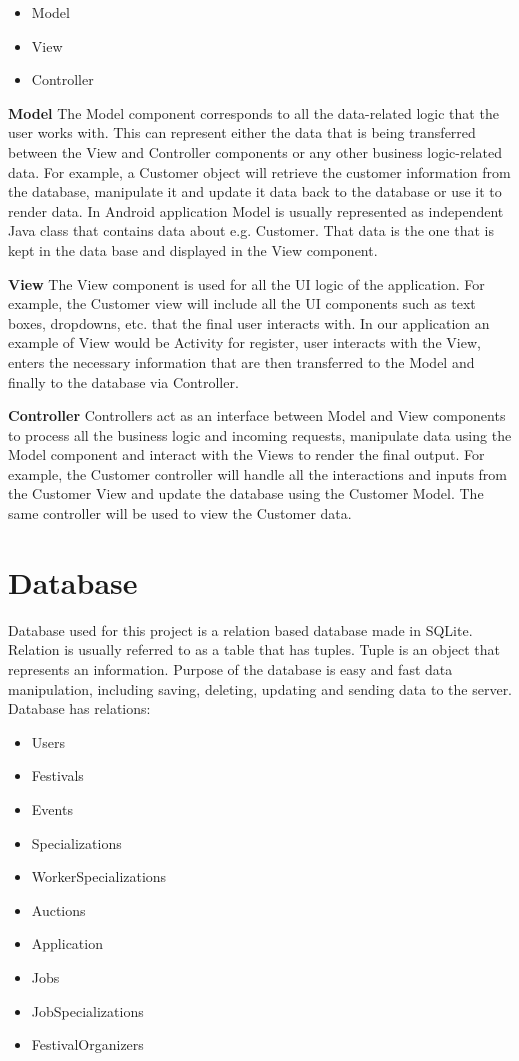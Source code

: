 \begin{itemize}
	\item 	 Model
	\item 	 View
	\item 	 Controller		
\end{itemize}

\textbf{Model}
The Model component corresponds to all the data-related logic that the user works with. This can represent either the data that is being transferred between the View and Controller components or any other business logic-related data. For example, a Customer object will retrieve the customer information from the database, manipulate it and update it data back to the database or use it to render data. 
In Android application Model is usually represented as independent Java class that contains data about e.g. Customer. That data is the one that is kept in the data base and displayed in the View component. 

\textbf{View}
The View component is used for all the UI logic of the application. For example, the Customer view will include all the UI components such as text boxes, dropdowns, etc. that the final user interacts with. 
In our application an example of View would be Activity for register, user interacts with the View, enters the necessary information that are then transferred to the Model and finally to the database via Controller.

\textbf{Controller}
Controllers act as an interface between Model and View components to process all the business logic and incoming requests, manipulate data using the Model component and interact with the Views to render the final output. For example, the Customer controller will handle all the interactions and inputs from the Customer View and update the database using the Customer Model. The same controller will be used to view the Customer data.
\pagebreak


\section{Database}

Database used for this project is a relation based database made in SQLite. Relation is usually referred to as a table that has tuples. Tuple is an object that represents an information. Purpose of the database is easy and fast data manipulation, including saving, deleting, updating and sending data to the server. Database has relations:
\begin{itemize}
	\item 	 Users
	\item 	 Festivals
	\item 	 Events
	\item 	 Specializations
	\item 	 WorkerSpecializations
	\item 	 Auctions
	\item 	 Application
	\item 	 Jobs
	\item 	 JobSpecializations
	\item 	 FestivalOrganizers
	
\end{itemize}
\pagebreak

